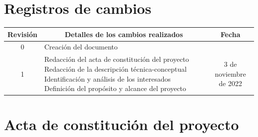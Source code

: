 \documentclass[
11pt, %
]{charter}
\begin{document}
\maketitle
\thispagestyle{empty}
\pagebreak


\thispagestyle{empty}
{\setlength{\parskip}{0pt}
\tableofcontents{}
}
\pagebreak


\section*{Registros de cambios}
\label{sec:registro}


\begin{table}[ht]
\label{tab:registro}
\centering
\begin{tabularx}{\linewidth}{@{}|c|X|c|@{}}
\hline
\rowcolor[HTML]{C0C0C0} 
Revisión & \multicolumn{1}{c|}{\cellcolor[HTML]{C0C0C0}Detalles de los cambios realizados} & Fecha      \\ \hline
0		& Creación del documento                                 &\fechaInicioName \\ \hline
1		& Redacción del acta de constitución del proyecto \newline
		Redacción de la descripción técnica-conceptual \newline
		Identificación y análisis de los interesados \newline
		Definición del propósito y alcance del proyecto
		& 3 de noviembre de 2022 \\ \hline
\end{tabularx}
\end{table}

\pagebreak



\section*{Acta de constitución del proyecto}
\label{sec:acta}
\end{document}

